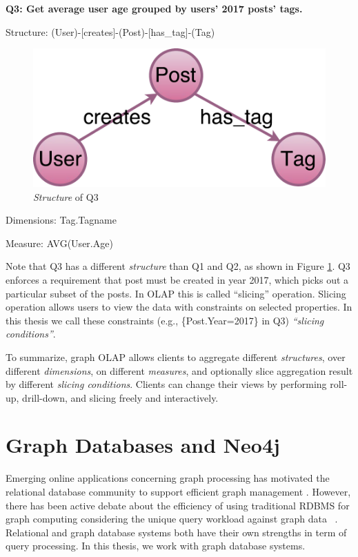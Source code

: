 \textbf{Q3: 		Get average user age grouped by users’ 2017 posts’ tags.}

Structure:	(User)-[creates]-(Post)-[has\_tag]-(Tag)
\begin{figure}[H]
	\centering
	\includegraphics[scale=0.35]{pic/meta2.pdf}
	\caption{\textit{Structure} of Q3}
	\label{fig:2:3}
\end{figure}


Dimensions:	{Tag.Tagname}

Measure:	{AVG(User.Age)}

Note that Q3 has a different \textit{structure} than Q1 and Q2, as shown in Figure \ref{fig:2:3}. Q3 enforces a requirement that post must be created in year 2017, which picks out a particular subset of  the posts. In OLAP this is called ``slicing'' operation. Slicing operation allows users to view the data with constraints on selected properties. In this thesis we call these constraints (e.g., \{Post.Year=2017\} in Q3) \textit{``slicing conditions''}.

To summarize, graph OLAP allows clients to aggregate different \textit{structures}, over different \textit{dimensions}, on different \textit{measures}, and optionally slice aggregation result by different \textit{slicing conditions}. Clients can change their views by performing roll-up, drill-down, and slicing freely and interactively.


\section{Graph Databases and Neo4j}
Emerging online applications concerning graph processing has motivated the relational database community to support efficient graph management \cite{DBLP:conf/grades/Xirogiannopoulos17} \cite{DBLP:conf/bigdataconf/JindalMCH15}. However, there has been active debate about the efficiency of using traditional RDBMS for graph computing considering the unique query workload against graph data~\cite{DBLP:conf/semweb/HernandezHRRZ16} \cite{DBLP:journals/corr/JoishiS17}. Relational and graph database systems both have their own strengths in term of query processing. In this thesis, we work with graph database systems.


